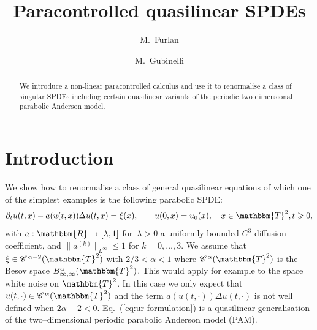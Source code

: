 \documentclass{amsart}
\newcommand{\nospace}{}
\theoremstyle{remark}
\theoremstyle{definition}
\newcommand{\CC}{\mathscr{C} \hspace{.1em}}
\begin{document}
\title{Paracontrolled quasilinear SPDEs}

\author{M.~Furlan}
\address{CEREMADE\\
PSL-Universit{\'e} Paris Dauphine, France}

\author{ M.~Gubinelli}
\address{IAM \& HCM\\
Universit{\"a}t Bonn, Germany}

\begin{abstract}
  We introduce a non-linear paracontrolled calculus and use it to renormalise
  a class of singular SPDEs including certain quasilinear variants of the
  periodic two dimensional parabolic Anderson model.
\end{abstract}

{\maketitle}

\section{Introduction}

We show how to renormalise a class of general quasilinear equations of which
one of the simplest examples is the following parabolic SPDE:
\begin{equation}
  \partial_t u (t, x) - a (u (t, x)) \Delta u (t, x) = \xi (x), \qquad u (0,
  x) = u_0 (x), \quad x \in \mathbbm{T}^2, t \geqslant 0,
  \label{eq:ur-formulation}
\end{equation}
with $a : \mathbbm{R} \rightarrow [\lambda, 1]$ for~$\lambda > 0$ a uniformly
bounded $C^3$ diffusion coefficient, and $\| a^{(k)} \|_{L^{\infty}} \leqslant
1$ for $k = 0, \ldots, 3$. We assume that $\xi \in \CC \nospace^{\alpha - 2}
(\mathbbm{T}^2)$ with $2 / 3 < \alpha < 1$ where $\CC^{\alpha}
(\mathbbm{T}^2)$ is the Besov space $B^{\alpha}_{\infty, \infty}
(\mathbbm{T}^2)$. This would apply for example to the space white noise on
$\mathbbm{T}^2$. In this case we only expect that $u (t, \cdot) \in
\CC^{\alpha} (\mathbbm{T}^2)$ and the term $a (u (t, \cdot)) \Delta u (t,
\cdot)$ is not well defined when $2 \alpha - 2 < 0$.
Eq.~(\ref{eq:ur-formulation}) is a quasilinear generalisation of the
two--dimensional periodic parabolic Anderson model (PAM).
\end{document}
